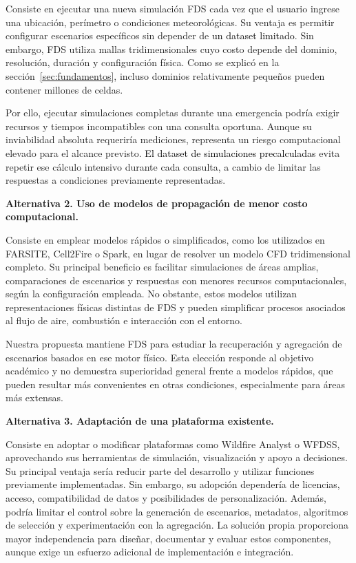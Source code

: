 Consiste en ejecutar una nueva simulación FDS cada vez que el usuario ingrese una ubicación, perímetro o condiciones meteorológicas. Su ventaja es permitir configurar escenarios específicos sin depender de \textcolor{black}{un dataset limitado}. Sin embargo, FDS utiliza mallas tridimensionales cuyo costo depende del dominio, resolución, duración y configuración física. Como se explicó en la sección~\ref{sec:fundamentos}, incluso dominios relativamente pequeños pueden contener millones de celdas.

Por ello, ejecutar simulaciones completas durante una emergencia podría exigir recursos y tiempos incompatibles con una consulta oportuna. Aunque su inviabilidad absoluta requeriría mediciones, representa un riesgo computacional elevado para el alcance previsto. \textcolor{black}{El dataset de simulaciones precalculadas} evita repetir ese cálculo intensivo durante cada consulta, a cambio de limitar las respuestas a condiciones previamente representadas.

\textbf{Alternativa 2. Uso de modelos de propagación de menor costo computacional.}

Consiste en emplear modelos rápidos o simplificados, como los utilizados en FARSITE, Cell2Fire o Spark, en lugar de resolver un modelo CFD tridimensional completo. Su principal beneficio es facilitar simulaciones de áreas amplias, comparaciones de escenarios y respuestas con menores recursos computacionales, según la configuración empleada. No obstante, estos modelos utilizan representaciones físicas distintas de FDS y pueden simplificar procesos asociados al flujo de aire, combustión e interacción con el entorno.

Nuestra propuesta mantiene FDS para estudiar la recuperación y agregación de escenarios basados en ese motor físico. Esta elección responde al objetivo académico y no demuestra superioridad general frente a modelos rápidos, que pueden resultar más convenientes en otras condiciones, especialmente para áreas más extensas.

\textbf{Alternativa 3. Adaptación de una plataforma existente.}

Consiste en adoptar o modificar plataformas como Wildfire Analyst o WFDSS, aprovechando sus herramientas de simulación, visualización y apoyo a decisiones. Su principal ventaja sería reducir parte del desarrollo y utilizar funciones previamente implementadas. Sin embargo, su adopción dependería de licencias, acceso, compatibilidad de datos y posibilidades de personalización. Además, podría limitar el control sobre la generación de escenarios, metadatos, algoritmos de selección y experimentación con la agregación. La solución propia proporciona mayor independencia para diseñar, documentar y evaluar estos componentes, aunque exige un esfuerzo adicional de implementación e integración.

